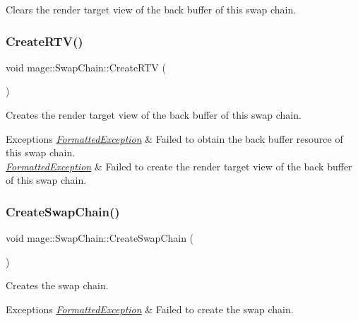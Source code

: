 Clears the render target view of the back buffer of this swap chain. \hypertarget{classmage_1_1_swap_chain_a9cdb798d8911e2f1239ad7eb79cc6b87}{}\label{classmage_1_1_swap_chain_a9cdb798d8911e2f1239ad7eb79cc6b87} 
\subsubsection{\texorpdfstring{Create\+R\+T\+V()}{CreateRTV()}}
{\footnotesize\ttfamily void mage\+::\+Swap\+Chain\+::\+Create\+R\+TV (\begin{DoxyParamCaption}{ }\end{DoxyParamCaption})\hspace{0.3cm}{\ttfamily [private]}}

Creates the render target view of the back buffer of this swap chain.


\begin{DoxyExceptions}{Exceptions}
{\em \hyperlink{classmage_1_1_formatted_exception}{Formatted\+Exception}} & Failed to obtain the back buffer resource of this swap chain. \\
\hline
{\em \hyperlink{classmage_1_1_formatted_exception}{Formatted\+Exception}} & Failed to create the render target view of the back buffer of this swap chain. \\
\hline
\end{DoxyExceptions}
\hypertarget{classmage_1_1_swap_chain_a9474cae31868f020c76439febc6e1afd}{}\label{classmage_1_1_swap_chain_a9474cae31868f020c76439febc6e1afd} 
\subsubsection{\texorpdfstring{Create\+Swap\+Chain()}{CreateSwapChain()}}
{\footnotesize\ttfamily void mage\+::\+Swap\+Chain\+::\+Create\+Swap\+Chain (\begin{DoxyParamCaption}{ }\end{DoxyParamCaption})\hspace{0.3cm}{\ttfamily [private]}}

Creates the swap chain.


\begin{DoxyExceptions}{Exceptions}
{\em \hyperlink{classmage_1_1_formatted_exception}{Formatted\+Exception}} & Failed to create the swap chain. \\
\hline
\end{DoxyExceptions}
\hypertarget{classmage_1_1_swap_chain_a9ed25cd34dedc97e25e26e58456ac2fe}{}\label{classmage_1_1_swap_chain_a9ed25cd34dedc97e25e26e58456ac2fe} 
